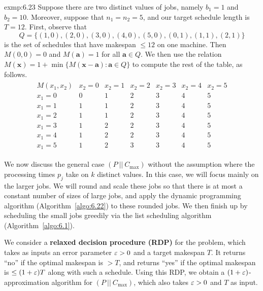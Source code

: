 \begin{exmp}{exmp:6.23}
    Suppose there are two distinct values of jobs, namely $b_1 = 1$ 
    and $b_2 = 10$. Moreover, suppose that $n_1 = n_2 = 5$, and 
    our target schedule length is $T = 12$. First, observe that 
    \[ Q = \{(1, 0), (2, 0), (3, 0), (4, 0), (5, 0), (0, 1), (1, 1), (2, 1)\} \] 
    is the set of schedules that have makespan $\leq 12$ on one machine. 
    Then $M(0, 0) = 0$ and $M(\mathbf a) = 1$ for all $\mathbf a \in Q$. 
    We then use the relation $M(\mathbf x) = 1 + \min\{M(\mathbf x - \mathbf a) 
    : \mathbf a \in Q\}$ to compute the rest of the table, as follows. 
    \begin{align*}
        \begin{array}{c|cccccc} 
            M(x_1, x_2) & x_2 = 0 & x_2 = 1 & x_2 = 2 & x_2 = 3 & x_2 = 4 & x_2 = 5 \\ \hline 
            x_1 = 0 & 0 & 1 & 2 & 3 & 4 & 5 \\
            x_1 = 1 & 1 & 1 & 2 & 3 & 4 & 5 \\ 
            x_1 = 2 & 1 & 1 & 2 & 3 & 4 & 5 \\ 
            x_1 = 3 & 1 & 2 & 2 & 3 & 4 & 5 \\ 
            x_1 = 4 & 1 & 2 & 2 & 3 & 4 & 5 \\ 
            x_1 = 5 & 1 & 2 & 3 & 3 & 4 & 5 
        \end{array}
    \end{align*}
\end{exmp}

We now discuss the general case $(P~||~C_{\max})$ without the assumption 
where the processing times $p_j$ take on $k$ distinct values. In this 
case, we will focus mainly on the larger jobs. We will round and scale 
these jobs so that there is at most a constant number of sizes of large 
jobs, and apply the dynamic programming algorithm (Algorithm~\ref{algo:6.22}) 
to these rounded jobs. We then finish up by scheduling the small jobs greedily 
via the list scheduling algorithm (Algorithm~\ref{algo:6.1}).

We consider a {\bf relaxed decision procedure (RDP)} for the problem, 
which takes as inputs an error parameter $\varepsilon > 0$ and a target makespan $T$. 
It returns ``no'' if the optimal makespan is $>T$, and returns ``yes'' 
if the optimal makespan is $\leq (1+\varepsilon)T$ along with such a schedule. 
Using this RDP, we obtain a $(1+\varepsilon)$-approximation algorithm for 
$(P~||~C_{\max})$, which also takes $\varepsilon > 0$ and $T$ as input. 

